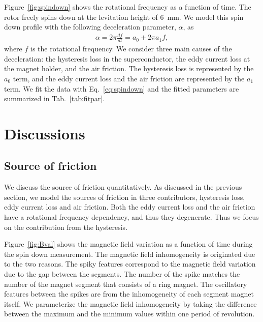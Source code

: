 \documentclass[iournal]{IEEEtran}
\begin{document}
Figure~\ref{fig:spindown} shows the rotational frequency as a function of time.
The rotor freely spins down at the levitation height of 6~mm.
We model this spin down profile with the following deceleration parameter, $\alpha$, as
\begin{eqnarray}
\alpha = 2\pi \frac{df}{dt} = a_0 + 2\pi a_1 f,
\label{eq:spindown}
\end{eqnarray}
where $f$ is the rotational frequency\cite{hull_review}.
We consider three main causes of the deceleration: the hysteresis loss in the superconductor, the eddy current loss at the magnet holder, and the air friction.
The hysteresis loss is represented by the $a_0$ term, and the eddy current loss and the air friction are represented by the $a_1$ term.
We fit the data with Eq.~\ref{eq:spindown} and the fitted parameters are summarized in Tab.~\ref{tab:fitpar}.

\section{Discussions}

\subsection{Source of friction}
We discuss the source of friction quantitatively.
As discussed in the previous section, we model the sources of friction in three contributors, hysteresis loss, eddy current loss and air friction.
Both the eddy current loss and the air friction have a rotational frequency dependency, and thus they degenerate.
Thus we focus on the contribution from the hysteresis.

Figure~\ref{fig:Bval} shows the magnetic field variation as a function of time during the spin down measurement.
The magnetic field inhomogeneity is originated due to the two reasons.
The spiky features correspond to the magnetic field variation due to the gap between the segments.
The number of the spike matches the number of the magnet segment that consists of a ring magnet.
The oscillatory features between the spikes are from the inhomogeneity of each segment magnet itself.
We parameterize the magnetic field inhomogeneity by taking the difference between the maximum and the minimum values within one period of revolution.
\end{document}
